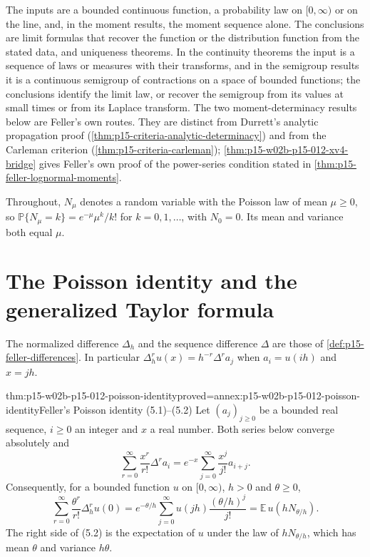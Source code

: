 The inputs are a bounded continuous function, a probability law on
\([0,\infty)\) or on the line, and, in the moment results, the moment
sequence alone. The conclusions are limit formulas that recover the function
or the distribution function from the stated data, and uniqueness theorems.
In the continuity theorems the input is a sequence of laws or measures with
their transforms, and in the semigroup results it is a continuous semigroup of
contractions on a space of bounded functions; the conclusions identify the
limit law, or recover the semigroup from its values at small times or from its
Laplace transform. The two moment-determinacy results below are Feller's own routes. They are
distinct from Durrett's analytic propagation proof
(\cref{thm:p15-criteria-analytic-determinacy}) and from the Carleman
criterion (\cref{thm:p15-criteria-carleman}); \cref{thm:p15-w02b-p15-012-xv4-bridge}
gives Feller's own proof of the power-series condition stated in
\cref{thm:p15-feller-lognormal-moments}.

Throughout, \(N_\mu\) denotes a random variable with the Poisson law of mean
\(\mu\geq0\), so \(\mathbb P\{N_\mu=k\}=e^{-\mu}\mu^k/k!\) for
\(k=0,1,\ldots\), with \(N_0=0\). Its mean and variance both equal \(\mu\).

\section{The Poisson identity and the generalized Taylor formula}
\label{sec:p15-w02b-p15-012-taylor}

The normalized difference \(\Delta_h\) and the sequence difference
\(\Delta\) are those of \cref{def:p15-feller-differences}. In particular
\(\Delta_h^r u(x)=h^{-r}\Delta^r a_j\) when \(a_i=u(ih)\) and \(x=jh\).

\begin{hbtheorem}{thm:p15-w02b-p15-012-poisson-identity}{proved=annex:p15-w02b-p15-012-poisson-identity}{Feller's Poisson identity (5.1)--(5.2)}
Let \((a_j)_{j\geq0}\) be a bounded real sequence, \(i\geq0\) an integer and
\(x\) a real number. Both series below converge absolutely and
\[
 \sum_{r=0}^\infty\frac{x^r}{r!}\Delta^r a_i
      = e^{-x}\sum_{j=0}^\infty\frac{x^j}{j!}a_{i+j}.
 \tag{5.1}
\]
Consequently, for a bounded function \(u\) on \([0,\infty)\), \(h>0\) and
\(\theta\geq0\),
\[
 \sum_{r=0}^\infty\frac{\theta^r}{r!}\Delta_h^r u(0)
      = e^{-\theta/h}\sum_{j=0}^\infty u(jh)\frac{(\theta/h)^j}{j!}
      = \mathbb E\,u(hN_{\theta/h}).
 \tag{5.2}
\]
The right side of (5.2) is the expectation of \(u\) under the law of
\(hN_{\theta/h}\), which has mean \(\theta\) and variance \(h\theta\).
\end{hbtheorem}

